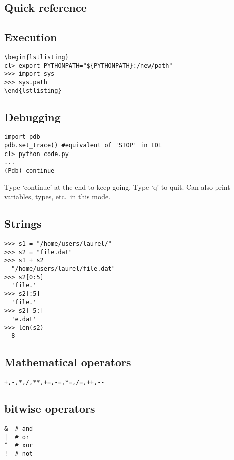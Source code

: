 \documentclass{article}
\begin{document}
\begin{multicols}{2}
\raggedcolumns
\section{Quick reference}
\setcounter{secnumdepth}{0}

\subsection{Execution}
\begin{verbatim}
\begin{lstlisting}
cl> export PYTHONPATH="${PYTHONPATH}:/new/path"
>>> import sys
>>> sys.path
\end{lstlisting}
\end{verbatim}

\subsection{Debugging}
\begin{lstlisting}
import pdb
pdb.set_trace() #equivalent of 'STOP' in IDL
cl> python code.py
...
(Pdb) continue
\end{lstlisting}
Type `continue' at the end to keep going. Type `q' to quit.
Can also print variables, types, etc.\ in this mode.

\subsection{Strings}
\begin{lstlisting}
>>> s1 = "/home/users/laurel/"
>>> s2 = "file.dat"
>>> s1 + s2
  "/home/users/laurel/file.dat"
>>> s2[0:5]
  'file.'
>>> s2[:5]
  'file.'
>>> s2[-5:]
  'e.dat'
>>> len(s2)
  8
\end{lstlisting}

\subsection{Mathematical operators}
\begin{lstlisting}
+,-,*,/,**,+=,-=,*=,/=,++,--
\end{lstlisting}

\subsection{bitwise operators}
\begin{lstlisting}
&  # and
|  # or
^  # xor
!  # not
\end{lstlisting}


\end{multicols}
\end{document}

